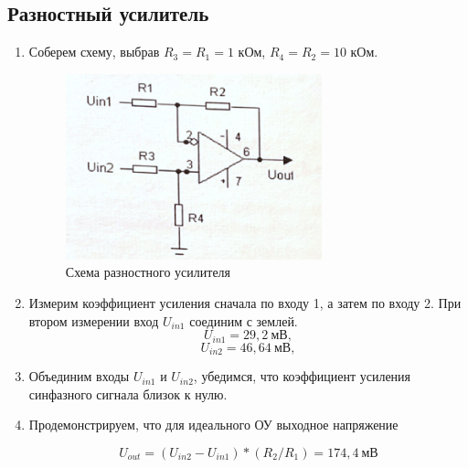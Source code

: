 \documentclass[a4paper, 12pt]{article}%
\begin{document}
\newpage
\subsection{Разностный усилитель}

\begin{enumerate}

\item Соберем схему, выбрав $R_3 = R_1 = 1$ кОм, $R_4 = R_2=10$ кОм.

\begin{figure}[h]
\begin{center}
\includegraphics[width = 0.7\textwidth]{scheme4.png}
\caption{Схема разностного усилителя}
\end{center}
\end{figure}

\item Измерим коэффициент усиления сначала по входу 1, а затем по входу 2. При втором измерении вход $U_{in1}$ соединим с землей.
\[U_{in1} = 29,2 \: \text{мВ},\]
\[U_{in2} = 46,64 \: \text{мВ},\]
\item Объединим входы $U_{in1}$ и $U_{in2}$, убедимся, что коэффициент усиления синфазного сигнала близок к нулю.
\item Продемонстрируем, что для идеального ОУ выходное напряжение

\[U_{out} = (U_{in2}-U_{in1})*(R_2 / R_1)=174,4 \: \text{мВ}\]

\end{enumerate}
\end{document}
